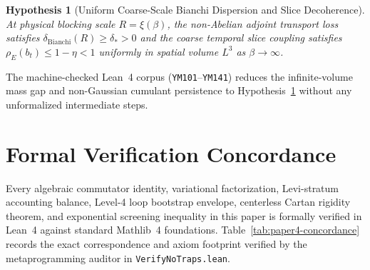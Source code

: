 \documentclass[11pt,a4paper]{article}
\newtheorem{hypothesis}{Hypothesis}[section]
\begin{document}
\begin{hypothesis}[Uniform Coarse-Scale Bianchi Dispersion and Slice Decoherence]
\label{hyp:p4-crossover}
At physical blocking scale $R = \xi(\beta)$, the non-Abelian adjoint transport loss satisfies $\delta_{\mathrm{Bianchi}}(R) \ge \delta_* > 0$ and the coarse temporal slice coupling satisfies $\rho_E(b_t) \le 1 - \eta < 1$ uniformly in spatial volume $L^3$ as $\beta \to \infty$.
\end{hypothesis}

The machine-checked Lean~4 corpus (\texttt{YM101}--\texttt{YM141}) reduces the infinite-volume mass gap and non-Gaussian cumulant persistence to Hypothesis~\ref{hyp:p4-crossover} without any unformalized intermediate steps.

\section{Formal Verification Concordance}
Every algebraic commutator identity, variational factorization, Levi-stratum accounting balance, Level-4 loop bootstrap envelope, centerless Cartan rigidity theorem, and exponential screening inequality in this paper is formally verified in Lean~4 against standard Mathlib~4 foundations. Table~\ref{tab:paper4-concordance} records the exact correspondence and axiom footprint verified by the metaprogramming auditor in \texttt{VerifyNoTraps.lean}.
\end{document}
